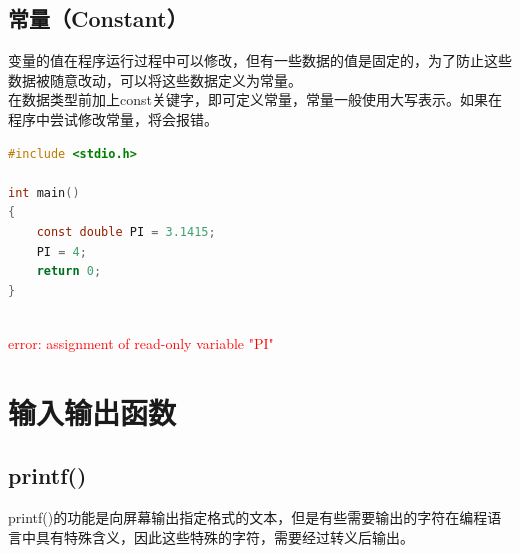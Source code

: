 \subsection{常量（Constant）}

变量的值在程序运行过程中可以修改，但有一些数据的值是固定的，为了防止这些数据被随意改动，可以将这些数据定义为常量。\\

在数据类型前加上const关键字，即可定义常量，常量一般使用大写表示。如果在程序中尝试修改常量，将会报错。\\


\begin{lstlisting}[language=C]
#include <stdio.h>

int main()
{
	const double PI = 3.1415;
	PI = 4;
	return 0;
}
\end{lstlisting}

\begin{tcolorbox}
	\\
	\textcolor{red}{error: assignment of read-only variable "PI"}
\end{tcolorbox}

\newpage

\section{输入输出函数}

\subsection{printf()}

printf()的功能是向屏幕输出指定格式的文本，但是有些需要输出的字符在编程语言中具有特殊含义，因此这些特殊的字符，需要经过转义后输出。\\

\begin{table}[H]
	\centering
	\caption{转义字符}
\end{table}

